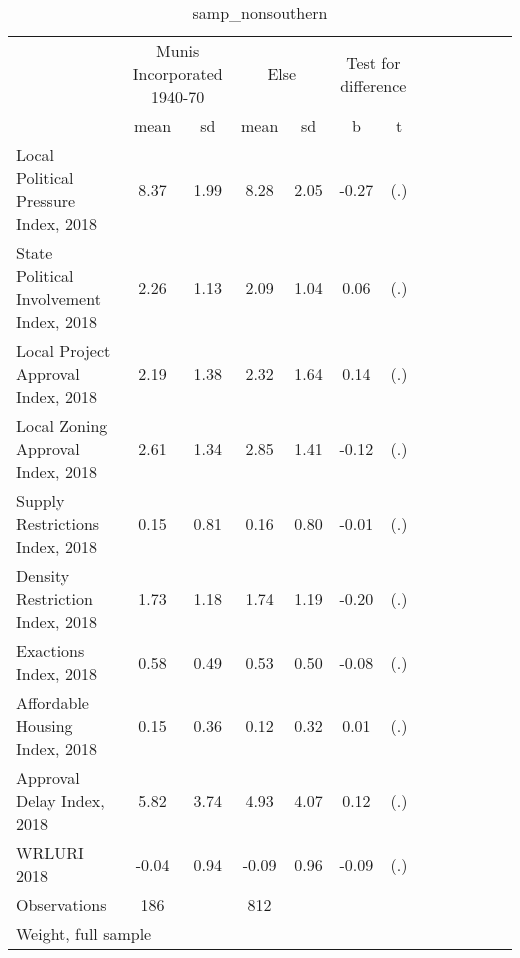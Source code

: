 \begin{table}[htbp]\centering
\def\sym#1{\ifmmode^{#1}\else\(^{#1}\)\fi}
\caption{samp\_nonsouthern \label{tab1}}
\begin{tabular}{l*{3}{cccc}}
\toprule
                    &\multicolumn{2}{c}{Munis Incorporated 1940-70}&\multicolumn{2}{c}{Else} &\multicolumn{2}{c}{Test for difference}\\
                    &        mean&          sd&        mean&          sd&           b         &           t\\
\midrule
Local Political Pressure Index, 2018&        8.37&        1.99&        8.28&        2.05&       -0.27         &         (.)\\
State Political Involvement Index, 2018&        2.26&        1.13&        2.09&        1.04&        0.06         &         (.)\\
Local Project Approval Index, 2018&        2.19&        1.38&        2.32&        1.64&        0.14         &         (.)\\
Local Zoning Approval Index, 2018&        2.61&        1.34&        2.85&        1.41&       -0.12         &         (.)\\
Supply Restrictions Index, 2018&        0.15&        0.81&        0.16&        0.80&       -0.01         &         (.)\\
Density Restriction Index, 2018&        1.73&        1.18&        1.74&        1.19&       -0.20         &         (.)\\
Exactions Index, 2018&        0.58&        0.49&        0.53&        0.50&       -0.08         &         (.)\\
Affordable Housing Index, 2018&        0.15&        0.36&        0.12&        0.32&        0.01         &         (.)\\
Approval Delay Index, 2018&        5.82&        3.74&        4.93&        4.07&        0.12         &         (.)\\
WRLURI 2018         &       -0.04&        0.94&       -0.09&        0.96&       -0.09         &         (.)\\
\midrule
Observations        &         186&            &         812&            &                     &            \\
\bottomrule
\multicolumn{7}{l}{\footnotesize Weight, full sample}\\
\end{tabular}
\end{table}
